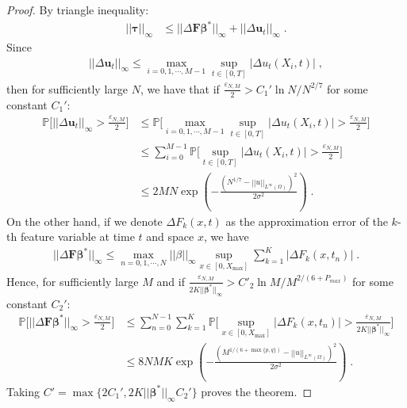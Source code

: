 \documentclass[a4paper,11pt]{article}
\newcommand{\btau}{\bm{\tau}}
\newcommand{\bbeta}{\bm{\beta}}
\newcommand{\bF}{\mathbf{F}}
\newcommand{\bu}{\mathbf{u}}
\begin{document}
\begin{proof}
By triangle inequality:
\begin{align*}
||\btau||_\infty&\leq ||\Delta \bF\bbeta^*||_\infty+||\Delta \bu_t||_\infty\;.
\end{align*}
Since
\begin{align*}
||\Delta \bu_t||_\infty\leq \max_{i=0,1,\cdots,M-1}\sup_{t\in[0,T]}|\Delta u_t(X_i,t)|\;,
\end{align*}
then for sufficiently large $N$, we have that if $\frac{\varepsilon_{N,M}}{2}>C_{1}'\ln N/N^{2/7}$ for some constant $C_1'$:
\begin{align*}
\mathbb{P}\Big[||\Delta \bu_t||_\infty>\frac{\varepsilon_{N,M}}{2}\Big]&\leq\mathbb{P}\Big[\max_{i=0,1,\cdots,M-1}\sup_{t\in[0,T]}|\Delta u_t(X_i,t)|>\frac{\varepsilon_{N,M}}{2}\Big]	\\
&\leq \sum_{i=0}^{M-1}\mathbb{P}\Big[\sup_{t\in[0,T]}|\Delta u_t(X_i,t)|>\frac{\varepsilon_{N,M}}{2}\Big]\\
&\leq 2MN \exp(-\frac{(N^{1/7}-||u||_{L^\infty(\Omega)})^2}{2\sigma^2})\;.
\end{align*}
On the other hand, if we denote $\Delta F_k(x,t)$ as the approximation error of the $k$-th feature variable at time $t$ and space $x$, we have
\begin{align*}
||\Delta \bF\bbeta^*||_\infty\leq \max_{n=0,1,\cdots, N}||\beta||_\infty	\sup_{x\in[0,X_{\max}]}\sum_{k=1}^K|\Delta F_{k}(x,t_n)|\;.
\end{align*}
Hence, for sufficiently large $M$ and if $\frac{\varepsilon_{N,M}}{2K||\bbeta^*||_\infty}>C'_2\ln M/M^{2/(6+P_{max})}$ for some constant $C_2'$:
\begin{align*}
\mathbb{P}\Big[||\Delta \bF\bbeta^*||_\infty>\frac{\varepsilon_{N,M}}{2}\Big]&\leq \sum_{n=0}^{N-1}\sum_{k=1}^{K}\mathbb{P}\Big[\sup_{x\in[0,X_{\max}]}|\Delta F_{k}(x,t_n)|>\frac{\varepsilon_{N,M}}{2K||\bbeta^*||_\infty}\Big]\\
&\leq 8NMK \exp(-\frac{(M^{1/(6+\max\{p,q\})}-||u||_{L^\infty(\Omega)})^2}{2\sigma^2})\;.
\end{align*}
Taking $C'=\max\{2C_1',2K||\bbeta^*||_\infty C_2'\}$   proves the theorem.
\end{proof}
\end{document}
